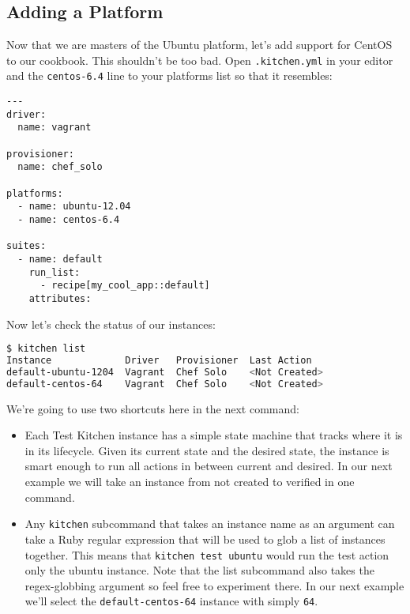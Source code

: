\subsection{Adding a Platform}

Now that we are masters of the Ubuntu platform, let's add support for CentOS to our cookbook. This shouldn't be too bad. Open \lstinline!.kitchen.yml! in your editor and the \lstinline!centos-6.4! line to your platforms list so that it resembles:

\begin{lstlisting}[label=lst:testing-test-kitchen20]
---
driver:
  name: vagrant

provisioner:
  name: chef_solo

platforms:
  - name: ubuntu-12.04
  - name: centos-6.4

suites:
  - name: default
    run_list:
      - recipe[my_cool_app::default]
    attributes:
\end{lstlisting}

Now let's check the status of our instances:

\begin{lstlisting}[language=Bash,label=lst:testing-test-kitchen21]
$ kitchen list
Instance             Driver   Provisioner  Last Action
default-ubuntu-1204  Vagrant  Chef Solo    <Not Created>
default-centos-64    Vagrant  Chef Solo    <Not Created>
\end{lstlisting}

We're going to use two shortcuts here in the next command:

\begin{itemize}
  \item Each Test Kitchen instance has a simple state machine that tracks where it is in its lifecycle. Given its current state and the desired state, the instance is smart enough to run all actions in between current and desired. In our next example we will take an instance from not created to verified in one command.
  \item Any \lstinline!kitchen! subcommand that takes an instance name as an argument can take a Ruby regular expression that will be used to glob a list of instances together. This means that \lstinline!kitchen test ubuntu! would run the test action only the ubuntu instance. Note that the list subcommand also takes the regex-globbing argument so feel free to experiment there. In our next example we'll select the \lstinline!default-centos-64! instance with simply \lstinline!64!.
\end{itemize}

